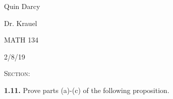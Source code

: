 \documentclass[12pt, a4paper]{article}
\begin{document}
  
\begin{flushleft}
  
    Quin Darcy\par
    Dr. Krauel\par
    MATH 134\par
    2/8/19
  
\end{flushleft}
  
\centerline{}
 
\vspace{4mm}
 
\noindent\textsc{Section: }\par
 
\justifying
 
\vspace{1mm}
 
\hline
 
\vspace{6mm}

\noindent\textbf{1.11.} Prove parts (a)-(c) of the following proposition. 
\end{document}
